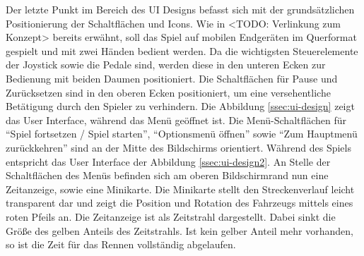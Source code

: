 	Der letzte Punkt im Bereich des UI Designs befasst sich mit der grundsätzlichen Positionierung der Schaltflächen und Icons. Wie in <TODO: Verlinkung zum Konzept> bereits erwähnt, soll das Spiel auf mobilen Endgeräten im Querformat gespielt und mit zwei Händen bedient werden. Da die wichtigsten Steuerelemente der Joystick sowie die Pedale sind, werden diese in den unteren Ecken zur Bedienung mit beiden Daumen positioniert. Die Schaltflächen für Pause und Zurücksetzen sind in den oberen Ecken positioniert, um eine versehentliche Betätigung durch den Spieler zu verhindern.
	Die Abbildung \ref{ssec:ui-design} zeigt das User Interface, während das Menü geöffnet ist. Die Menü-Schaltflächen für \enquote{Spiel fortsetzen / Spiel starten}, \enquote{Optionsmenü öffnen} sowie \enquote{Zum Hauptmenü zurückkehren} sind an der Mitte des Bildschirms orientiert.
	Während des Spiels entspricht das User Interface der Abbildung \ref{ssec:ui-design2}. An Stelle der Schaltflächen des Menüs befinden sich am oberen Bildschirmrand nun eine Zeitanzeige, sowie eine Minikarte. Die Minikarte stellt den Streckenverlauf leicht transparent dar und zeigt die Position und Rotation des Fahrzeugs mittels eines roten Pfeils an. Die Zeitanzeige ist als Zeitstrahl dargestellt. Dabei sinkt die Größe des gelben Anteils des Zeitstrahls. Ist kein gelber Anteil mehr vorhanden, so ist die Zeit für das Rennen vollständig abgelaufen.

